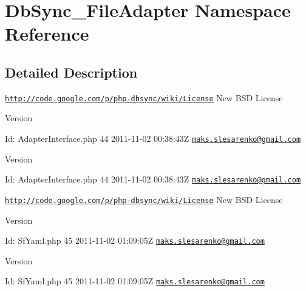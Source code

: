 \hypertarget{namespaceDbSync__FileAdapter}{
\section{DbSync\_\-FileAdapter Namespace Reference}
\label{namespaceDbSync__FileAdapter}
}


\subsection{Detailed Description}
\href{http://code.google.com/p/php-dbsync/wiki/License}{\tt http://code.google.com/p/php-\/dbsync/wiki/License} New BSD License \begin{DoxyVersion}{Version}

\end{DoxyVersion}
\begin{DoxyParagraph}{Id:}
AdapterInterface.php 44 2011-\/11-\/02 00:38:43Z \href{mailto:maks.slesarenko@gmail.com}{\tt maks.slesarenko@gmail.com} 
\end{DoxyParagraph}


\begin{DoxyVersion}{Version}

\end{DoxyVersion}
\begin{DoxyParagraph}{Id:}
AdapterInterface.php 44 2011-\/11-\/02 00:38:43Z \href{mailto:maks.slesarenko@gmail.com}{\tt maks.slesarenko@gmail.com} 
\end{DoxyParagraph}


\href{http://code.google.com/p/php-dbsync/wiki/License}{\tt http://code.google.com/p/php-\/dbsync/wiki/License} New BSD License \begin{DoxyVersion}{Version}

\end{DoxyVersion}
\begin{DoxyParagraph}{Id:}
SfYaml.php 45 2011-\/11-\/02 01:09:05Z \href{mailto:maks.slesarenko@gmail.com}{\tt maks.slesarenko@gmail.com} 
\end{DoxyParagraph}


\begin{DoxyVersion}{Version}

\end{DoxyVersion}
\begin{DoxyParagraph}{Id:}
SfYaml.php 45 2011-\/11-\/02 01:09:05Z \href{mailto:maks.slesarenko@gmail.com}{\tt maks.slesarenko@gmail.com} 
\end{DoxyParagraph}
